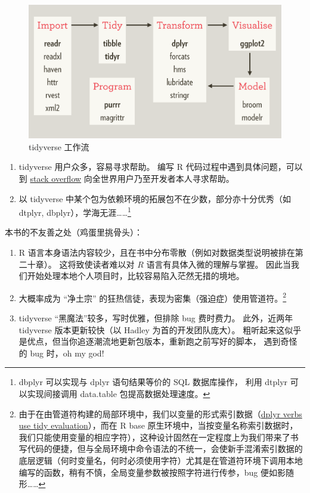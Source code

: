 \documentclass[11pt,hyperref]{ctexart}
\begin{document}
\begin{figure}
\centering
\includegraphics{images/tidyverse-workflow.png}
\caption{tidyverse 工作流}
\end{figure}

\begin{enumerate}
\def\labelenumi{\arabic{enumi}.}
\setcounter{enumi}{2}
\item
  tidyverse 用户众多，容易寻求帮助。 编写 R
  代码过程中遇到具体问题，可以到
  \href{https://stackoverflow.com/questions/tagged/r}{stack overflow}
  向全世界用户乃至开发者本人寻求帮助。
\item
  以 tidyverse 中某个包为依赖环境的拓展包不在少数，部分亦十分优秀（如
  dtplyr, dbplyr），学海无涯\ldots\ldots{}\footnote{dbplyr 可以实现与
    dplyr 语句结果等价的 SQL 数据库操作， 利用 dtplyr 可以实现间接调用
    data.table 包提高数据处理速度。}
\end{enumerate}

本书的不友善之处（鸡蛋里挑骨头）：

\begin{enumerate}
\def\labelenumi{\arabic{enumi}.}
\item
  R
  语言本身语法内容较少，且在书中分布零散（例如对数据类型说明被排在第二十章）。
  这将致使读者难以对 \(R\) 语言有具体入微的理解与掌握。
  因此当我们开始处理本地个人项目时，比较容易陷入茫然无措的境地。
\item
  大概率成为 ``净土宗''
  的狂热信徒，表现为密集（强迫症）使用管道符。\footnote{由于在由管道符构建的局部环境中，我们以变量的形式索引数据（\href{https://cran.r-project.org/web/packages/dplyr/vignettes/programming.html}{dplyr
    verbs use tidy evaluation}），而在 R base
    原生环境中，当按变量名称索引数据时，我们只能使用变量的相应字符），这种设计固然在一定程度上为我们带来了书写代码的便捷，但与全局环境中命令语法的不统一，会使新手混淆索引数据的底层逻辑（何时变量名，何时必须使用字符）尤其是在管道符环境下调用本地编写的函数，稍有不慎，全局变量参数被按照字符进行传参，bug
    便如影随形\ldots\ldots{}}
\item
  tidyverse ``黑魔法''较多，写时优雅，但排除 bug 费时费力。 此外，近两年
  tidyverse 版本更新较快（以 Hadley 为首的开发团队庞大）。
  粗听起来这似乎是优点，但当你追逐潮流地更新包版本，重新跑之前写好的脚本，
  遇到奇怪的 bug 时，oh my god!
\end{enumerate}
\end{document}
